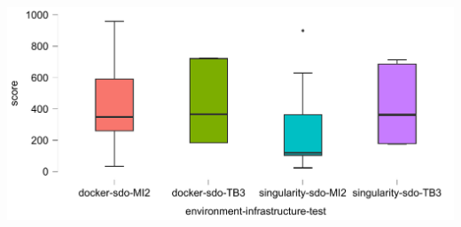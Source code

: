 

    \centerline{
    \includegraphics[width=1.05\linewidth]{./figures/data/Boxplot_VAR_score_SPLIT_enviroment-infrastructure-test_FILTER_sdo.pdf}  }
